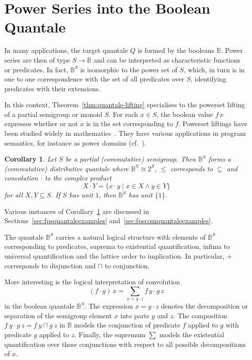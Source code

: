 \documentclass[12pt]{article}
\newtheorem{corollary}{Corollary}
\theoremstyle{definition}
\newcommand{\refthm}[1]{Theorem~\ref{#1}}
\begin{document}
\section{Power Series into the  Boolean Quantale}\label{sec:booleancase}

In many applications, the target quantale $Q$ is formed by the
booleans $\mathbb{B}$. Power series are then of type $S\to\mathbb{B}$
and can  be interpreted as characteristic functions or
predicates. In fact, $\mathbb{B}^S$ is isomorphic to the power set of
$S$, which, in turn is in one to one correspondence with the set of
all predicates over $S$, identifying predicates with their extensions.

In this context, \refthm{thm:quantale-lifting} specialises to the
powerset lifting of a partial semigroup or monoid $S$. For each $x\in
S$, the boolean value $f\, x$ expresses whether or not $x$ is in the set
corresponding to $f$. Powerset liftings have been studied widely in
mathematics~\cite{Goldblatt,Brink}. They have various applications in
program semantics, for instance as power domains (cf.~\cite{AbramskyJung}).

\begin{corollary}\label{cor:powerset-lifting}
  Let $S$ be a partial (commutative) semigroup. Then $\mathbb{B}^S$
  forms a (commutative) distributive quantale where $\mathbb{B}^S\cong
  2^S$, $\le$ corresponds to $\subseteq$ and convolution $\cdot$ to
  the complex product
  \begin{equation*}
    X\cdot Y =\{x\cdot y \mid x\in X\wedge y\in Y\}
  \end{equation*}
  for all $X,Y\subseteq S$. If $S$ has unit $1$, then $\mathbb{B}^S$
  has unit $\{1\}$.
\end{corollary}
Various instances of Corollary~\ref{cor:powerset-lifting} are discussed
in Sections~\ref{sec:fpsquantaleexamples}
and~\ref{sec:fpscomquantaleexamples}.

The quantale $\mathbb{B}^S$ carries a natural logical structure with
elements of $\mathbb{B}^S$ corresponding to predicates, suprema to
existential quantification, infima to universal quantification and the
lattice order to implication.  In particular, $+$ corresponds to
disjunction and $\sqcap$ to conjunction.

More interesting is the logical interpretation of convolution
\begin{equation*}
(f\cdot g)\, x =\sum_{x=y\cdot
  z} f\, y\cdot g\, z
\end{equation*}
in the boolean quantale $\mathbb{B}^S$. The expression $x= y\cdot z$
denotes the decomposition or separation of the semigroup element $x$
into parts $y$ and $z$. The composition $f\ y\cdot g\ z=f\ y\sqcap g\
z$ in $\mathbb{B}$ models the conjunction of predicate $f$ applied to
$y$ with predicate $g$ applied to $z$. Finally, the supremum $\sum$
models the existential quantification over these
conjunctions with respect to all possible decompositions of $x$.
\end{document}
